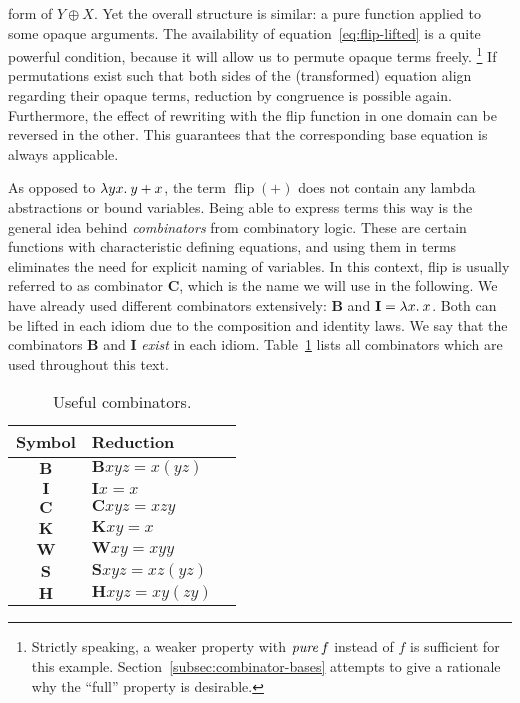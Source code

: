 form of $Y \oplus X$.
Yet the overall structure is similar: a pure function applied to some opaque
arguments.
The availability of equation~\eqref{eq:flip-lifted} is a quite powerful
condition, because it will allow us to permute opaque terms freely.%
\footnote{Strictly speaking, a weaker property with $\operatorname{\mathit{pure}} f$ instead of $f$ is
sufficient for this example. Section~\ref{subsec:combinator-bases} attempts to
give a rationale why the ``full'' property is desirable.}
If permutations exist such that both sides of the (transformed) equation align
regarding their opaque terms, reduction by congruence is possible again.
Furthermore, the effect of rewriting with the flip function in one domain
can be reversed in the other.
This guarantees that the corresponding base equation is always applicable.

As opposed to $\lambda yx.\>y + x$, the term $\operatorname{flip}{(+)}$ does not
contain any lambda abstractions or bound variables.
Being able to express terms this way is the general idea behind
\emph{combinators} from combinatory logic.
These are certain functions with characteristic defining equations, and using
them in terms eliminates the need for explicit naming of variables.
In this context, flip is usually referred to as combinator $\mathbf{C}$, which
is the name we will use in the following.
We have already used different combinators extensively: $\mathbf{B}$ and
$\mathbf{I} = \lambda x.\>x$.
Both can be lifted in each idiom due to the composition and identity laws.
We say that the combinators $\mathbf{B}$ and $\mathbf{I}$ \emph{exist} in
each idiom.
Table~\ref{tab:combinators} lists all combinators which are used throughout
this text.

\begin{table}\centering
\begin{tabular}{cll}
Symbol & Reduction \\
\hline
$\mathbf{B}$ & $\mathbf{B} x y z = x (y z)$ \\
$\mathbf{I}$ & $\mathbf{I} x = x$ \\
\hline
$\mathbf{C}$ & $\mathbf{C} x y z = x z y$ \\
$\mathbf{K}$ & $\mathbf{K} x y = x$ \\
$\mathbf{W}$ & $\mathbf{W} x y = x y y$ \\
$\mathbf{S}$ & $\mathbf{S} x y z = x z (y z)$ \\
$\mathbf{H}$ & $\mathbf{H} x y z = x y (z y)$ \\
\end{tabular}
\caption{Useful combinators.}
\label{tab:combinators}
\end{table}

